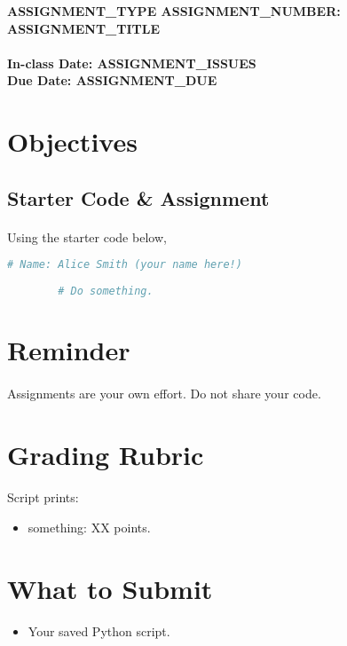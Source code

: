 \documentclass[letter,10pt]{article}
\begin{document}
    
    \huge
    \textbf{ASSIGNMENT_TYPE ASSIGNMENT_NUMBER: ASSIGNMENT_TITLE}
    \normalsize
    \\ ~~ \\
    \textbf{In-class Date: ASSIGNMENT_ISSUES} \\
    \textbf{Due Date: ASSIGNMENT_DUE}
    
    \section*{Objectives}
    \paragraph{}
    
    \subsection*{Starter Code \& Assignment}
    \paragraph{}Using the starter code below, 
    
    \begin{lstlisting}[language=python]
        # Name: Alice Smith (your name here!)
        
        # Do something.
    \end{lstlisting}
    
    \section*{Reminder}
    \paragraph{}Assignments are your own effort. Do not share your code.
    
    
    \section*{Grading Rubric}
    \paragraph{}Script prints:
    \begin{itemize}
        \item something: XX points.
    \end{itemize}
    
    \section*{What to Submit}
    \begin{itemize}
        \item Your saved Python script.
    \end{itemize}
    
\end{document}
